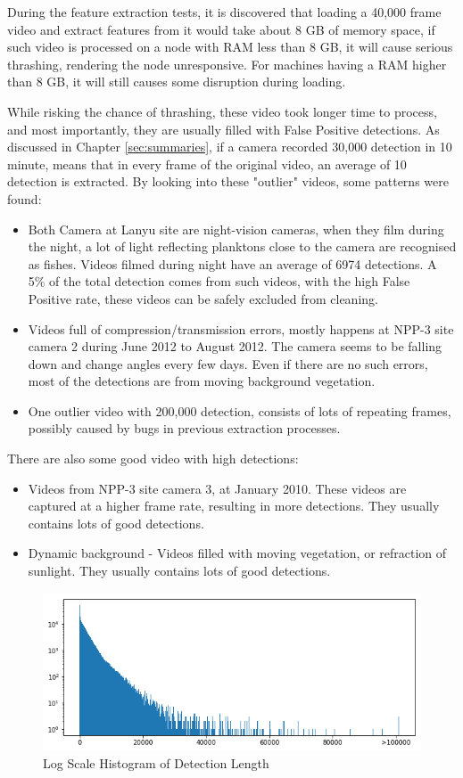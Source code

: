 \documentclass[bsc,logo,twoside,fullspacing,parskip]{infthesis}
\begin{document}
During the feature extraction tests, it is discovered that loading a 40,000 frame video and extract features from it would take about 8 GB of memory space, if such video is processed on a node with RAM less than 8 GB, it will cause serious thrashing, rendering the node unresponsive. For machines having a RAM higher than 8 GB, it will still causes some disruption during loading.  

While risking the chance of thrashing, these video took longer time to process, and most importantly, they are usually filled with False Positive detections. As discussed in Chapter \ref{sec:summaries}, if a camera recorded 30,000 detection in 10 minute, means that in every frame of the original video, an average of 10 detection is extracted. By looking into these "outlier" videos, some patterns were found:

\begin{itemize}
\item
Both Camera at Lanyu site are night-vision cameras, when they film during the night, a lot of light reflecting planktons close to the camera are recognised as fishes. Videos filmed during night have an average of 6974 detections. A 5\% of the total detection comes from such videos, with the high False Positive rate, these videos can be safely excluded from cleaning.
\item
Videos full of compression/transmission errors, mostly happens at NPP-3 site camera 2 during June 2012 to August 2012. The camera seems to be falling down and change angles every few days. Even if there are no such errors, most of the detections are from moving background vegetation.
\item
One outlier video with 200,000 detection, consists of lots of repeating frames, possibly caused by bugs in previous extraction processes.
\end{itemize}
There are also some good video with high detections: 
\begin{itemize}
\item
Videos from NPP-3 site camera 3, at January 2010. These videos are captured at a higher frame rate, resulting in more detections. They usually contains lots of good detections.
\item
Dynamic background - Videos filled with moving vegetation, or refraction of sunlight. They usually contains lots of good detections.
\end{itemize}

\begin{figure}
\centering
    \includegraphics[scale=0.65]{graph/frame_distribution.png}
    \caption{Log Scale Histogram of Detection Length}
    \label{fig:vidlength}
\end{figure}
\end{document}
